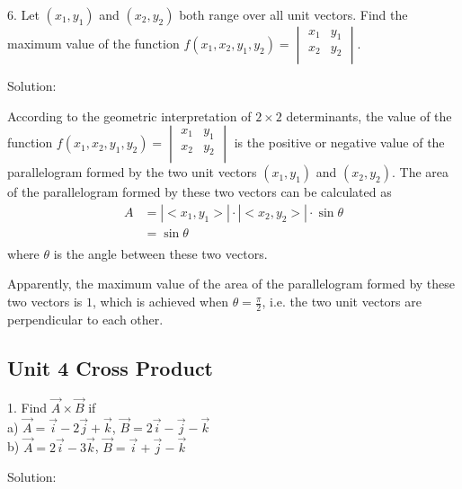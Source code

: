 \documentclass{article}
\begin{document}
6. Let $(x_{1}, y_{1})$ and $(x_{2}, y_{2})$ both range over all unit vectors.
Find the maximum value of the function $f(x_{1}, x_{2}, y_{1}, y_{2}) =
\begin{vmatrix}
x_{1} & y_{1} \\
x_{2} & y_{2} \\
\end{vmatrix}$.

Solution:

According to the geometric interpretation of $2 \times 2$ determinants, the 
value of the function $f(x_{1}, x_{2}, y_{1}, y_{2}) =
\begin{vmatrix}
x_{1} & y_{1} \\
x_{2} & y_{2} \\
\end{vmatrix}$ is the positive or negative value of the parallelogram formed by 
the two unit vectors $(x_1, y_1)$ and $(x_2, y_2)$. The area of the 
parallelogram formed by these two vectors can be calculated as
\begin{equation*}
\begin{split}
  A &= |<x_1, y_1>| \cdot |<x_2, y_2>| \cdot \sin\theta \\
    &= \sin\theta \\
\end{split}
\end{equation*}
where $\theta$ is the angle between these two vectors.

Apparently, the maximum value of the area of the parallelogram formed by these 
two vectors is $1$, which is achieved when $\theta = \frac{\pi}{2}$, i.e. the 
two unit vectors are perpendicular to each other.

\subsection*{Unit 4 Cross Product}

1. Find $\vec{A} \times \vec{B}$ if\\
a) $\vec{A} = \vec{i} - 2 \vec{j} + \vec{k}$, $\vec{B} = 2 \vec{i} - \vec{j} -
\vec{k}$ \\
b) $\vec{A} = 2 \vec{i} - 3 \vec{k}$, $\vec{B} = \vec{i} + \vec{j} - \vec{k}$

Solution:
\end{document}
